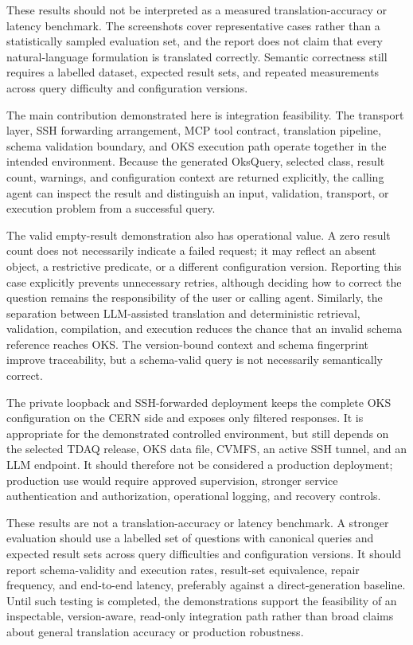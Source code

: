 \documentclass[12pt, a4paper]{report}
\begin{document}
These results should not be interpreted as a measured translation-accuracy or
latency benchmark. The screenshots cover representative cases rather than a
statistically sampled evaluation set, and the report does not claim that every
natural-language formulation is translated correctly. Semantic correctness
still requires a labelled dataset, expected result sets, and repeated
measurements across query difficulty and configuration versions.

The main contribution demonstrated here is integration feasibility. The
transport layer, SSH forwarding arrangement, MCP tool contract, translation
pipeline, schema validation boundary, and OKS execution path operate together
in the intended environment. Because the generated OksQuery, selected class,
result count, warnings, and configuration context are returned explicitly, the
calling agent can inspect the result and distinguish an input, validation,
transport, or execution problem from a successful query.

The valid empty-result demonstration also has operational value. A zero result
count does not necessarily indicate a failed request; it may reflect an absent
object, a restrictive predicate, or a different configuration version. Reporting
this case explicitly prevents unnecessary retries, although deciding how to
correct the question remains the responsibility of the user or calling agent.
Similarly, the separation between LLM-assisted translation and deterministic
retrieval, validation, compilation, and execution reduces the chance that an
invalid schema reference reaches OKS. The version-bound context and schema
fingerprint improve traceability, but a schema-valid query is not necessarily
semantically correct.

The private loopback and SSH-forwarded deployment keeps the complete OKS
configuration on the CERN side and exposes only filtered responses. It is
appropriate for the demonstrated controlled environment, but still depends on
the selected TDAQ release, OKS data file, CVMFS, an active SSH tunnel, and an
LLM endpoint. It should therefore not be considered a production deployment;
production use would require approved supervision, stronger service
authentication and authorization, operational logging, and recovery controls.

These results are not a translation-accuracy or latency benchmark. A stronger
evaluation should use a labelled set of questions with canonical queries and
expected result sets across query difficulties and configuration versions. It
should report schema-validity and execution rates, result-set equivalence,
repair frequency, and end-to-end latency, preferably against a direct-generation
baseline. Until such testing is completed, the demonstrations support the
feasibility of an inspectable, version-aware, read-only integration path rather
than broad claims about general translation accuracy or production robustness.
\end{document}
